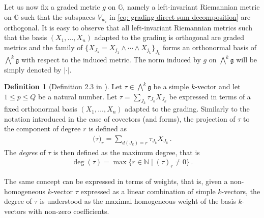 \documentclass[dvipsnames]{amsart}
\theoremstyle{definition}
\newtheorem{definition}[theorem]{Definition}
\theoremstyle{definition}
\numberwithin{equation}{section}
\newcommand{\G}{\mathbb{G}}
\begin{document}
Let us now fix a graded metric $g$ on $\G$, namely a left-invariant Riemannian metric on $\G$ such that the subspaces $V_{w_i}$ in \eqref{eq: grading direct sum decomposition} are orthogonal. It is easy to observe that all left-invariant Riemannian metrics such that the basis $(X_1,\ldots,X_n)$ adapted to the grading is orthogonal are graded metrics and the family of $\{X_{J_k}=X_{j_1}\wedge\cdots\wedge X_{j_k}\}_{J_k}$ forms an orthonormal basis of $\bigwedge^k\mathfrak{g}$ with respect to the induced metric. The norm induced by $g$ on $\bigwedge^k\mathfrak{g}$ will be simply denoted by $|\cdot|$.
\begin{definition}[Definition 2.3 in \cite{Mag13Vit}] Let $\tau\in\bigwedge^k\mathfrak{g}$ be a simple $k$-vector and let $1\le p\le Q$ be a natural number. Let $\tau=\sum_{J_k}\tau_{J_k}X_{J_k}$ be expressed in terms of a fixed orthonormal basis $(X_1,\ldots,X_n)$ adapted to the grading. Similarly to the notation introduced in the case of covectors (and forms), the projection of $\tau$ to the component of degree $r$ is defined as
\begin{align*}
    \big(\tau\big)_r=\sum_{d(J_k)=r}\tau_{J_k}X_{J_k}\,.
\end{align*}
The \textit{degree} of $\tau$ is then defined as the maximum degree, that is
\begin{align*}
    \operatorname{deg}(\tau)=\max\{r\in\mathbb N\mid (\tau)_r\neq 0\}\,.
\end{align*}
\end{definition}
The same concept can be expressed in terms of weights, that is, given a non-homogeneous $k$-vector $\tau$ expressed as a linear combination of simple $k$-vectors, the degree of $\tau$ is understood as the maximal homogeneous weight of the basis $k$-vectors with non-zero coefficients.
\end{document}
